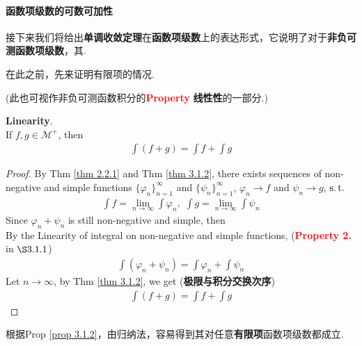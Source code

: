 \newpage
\paragraph{函数项级数的可数可加性}
	接下来我们将给出\textbf{单调收敛定理}在\textbf{函数项级数}上的表达形式，它说明了对于\textbf{非负可测函数项级数}，其.
	
	\vspace{2em}
	在此之前，先来证明有限项的情况.
	\begin{center}
		(此也可视作非负可测函数积分的\textcolor{red}{\textbf{Property}} \textbf{线性性}的一部分.)
	\end{center}
	\begin{proposition}\label{prop 3.1.2}
		\textbf{Linearity}.\\
		If $f , g \in \mathcal{M}^{+}$, then
		\begin{align}
			\int{(f + g)} = \int{f} + \int{g}
		\end{align}
	
		\vspace{2em}
		\begin{proof}
			By Thm \ref{thm 2.2.1} and Thm \ref{thm 3.1.2}, there exists sequences of non-negative and simple functions $\{ \varphi_n \}_{n = 1}^{\infty}$ and $\{ \psi_n \}_{n = 1}^{\infty}$, $\varphi_n \to f$ and $\psi_n \to g$, $\operatorname{s.t.}$
			\begin{align}
				\int{f} = \lim_{n \to \infty}{\int{\varphi_n}} , \,\, \int{g} = \lim_{n \to \infty}{\int{\psi_n}}
			\end{align}
			Since $\varphi_n + \psi_n$ is still non-negative and simple, then \\
			By the Linearity of integral on non-negative and simple functions, (\textcolor{red}{\textbf{Property 2.}} in $\S 3.1.1$)
			\begin{align}
				\int{(\varphi_n + \psi_n)} = \int{\varphi_n} + \int{\psi_n}
			\end{align}
			Let $n \to \infty$, by Thm \ref{thm 3.1.2}, we get (\textbf{极限与积分交换次序})
			\begin{align}
				\int{(f + g)} = \int{f} + \int{g}
			\end{align}
		\end{proof}
	\end{proposition}
	
	根据Prop \ref{prop 3.1.2}，由归纳法，容易得到其对任意\textbf{有限项}函数项级数都成立.
	

